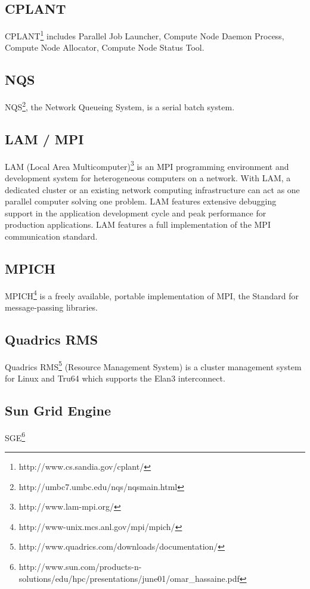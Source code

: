 \subsection{CPLANT}

CPLANT\footnote{http://www.cs.sandia.gov/cplant/} includes
Parallel Job Launcher, Compute Node Daemon Process,
Compute Node Allocator, Compute Node Status Tool.

\subsection{NQS} 

NQS\footnote{http://umbc7.umbc.edu/nqs/nqsmain.html}, 
the Network Queueing System, is a serial batch system.

\subsection{LAM / MPI}

LAM (Local Area Multicomputer)\footnote{http://www.lam-mpi.org/}
is an MPI programming environment and development system for heterogeneous 
computers on a network. 
With LAM, a dedicated cluster or an existing network
computing infrastructure can act as one parallel computer solving
one problem.  LAM features extensive debugging support in the
application development cycle and peak performance for production
applications. LAM features a full implementation of the MPI
communication standard.

\subsection{MPICH}

MPICH\footnote{http://www-unix.mcs.anl.gov/mpi/mpich/}
is a freely available, portable implementation of MPI,
the Standard for message-passing libraries.

\subsection{Quadrics RMS}

Quadrics
RMS\footnote{http://www.quadrics.com/downloads/documentation/}
(Resource Management System) is a cluster management system for 
Linux and Tru64 which supports the
Elan3 interconnect.  

\subsection{Sun Grid Engine}

SGE\footnote{http://www.sun.com/products-n-solutions/edu/hpc/presentations/june01/omar\_hassaine.pdf}

\newpage

